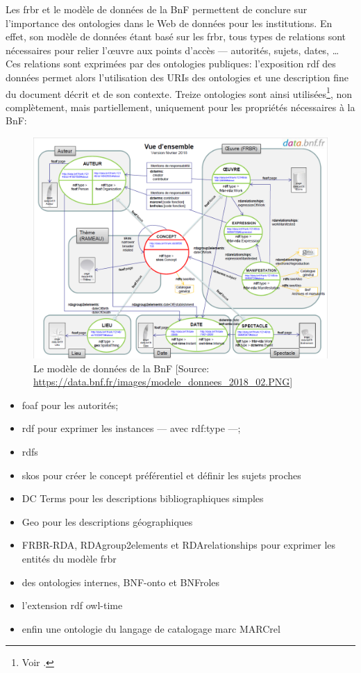 \bigskip
\bigskip
\bigskip
Les \ac{frbr} et le modèle de données de la BnF permettent de conclure sur l'importance des ontologies dans le Web de données pour les institutions. En effet, son modèle de données étant basé sur les \ac{frbr}, tous types de relations sont nécessaires pour relier l'œuvre aux points d'accès --- autorités, sujets, dates, \dots~ Ces relations sont exprimées par des ontologies publiques: l'exposition \ac{rdf} des données permet alors l'utilisation des URIs des ontologies et une description fine du document décrit et de son contexte. Treize ontologies sont ainsi utilisées\footnote{Voir .}, non complètement, mais partiellement, uniquement pour les propriétés nécessaires à la BnF:
\begin{figure}[!h]
	\centering
	\includegraphics[width=15cm]{images/mdd_bnf.PNG}
	\caption[Le modèle de données de la BnF]{Le modèle de données de la BnF [Source: \url{https://data.bnf.fr/images/modele_donnees_2018_02.PNG}]}
	\label{mdd_bnf}
\end{figure}
\begin{itemize}
	\item \ac{foaf} pour les autorités;
	\item \ac{rdf} pour exprimer les instances --- avec rdf:type ---;
	\item \ac{rdfs}
	\item \ac{skos} pour créer le concept préférentiel et définir les sujets proches 
	\item DC Terms pour les descriptions bibliographiques simples
	\item Geo pour les descriptions géographiques
	\item FRBR-RDA, RDAgroup2elements et RDArelationships pour exprimer les entités du modèle \ac{frbr}
	\item des ontologies internes, BNF-onto et BNFroles
	\item l'extension \ac{rdf} \ac{owl}-time
	\item enfin une ontologie du langage de catalogage \ac{marc} MARCrel
\end{itemize}

